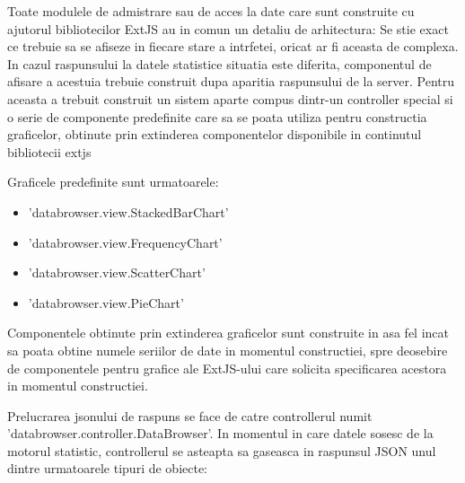 Toate modulele de admistrare sau de acces la date care sunt construite cu ajutorul bibliotecilor ExtJS au in comun un detaliu de arhitectura: Se stie exact ce trebuie sa se afiseze in fiecare stare a intrfetei, oricat ar fi aceasta de complexa. In cazul raspunsului la datele statistice situatia este diferita, componentul de afisare a acestuia trebuie construit dupa aparitia raspunsului de la server. Pentru aceasta a trebuit construit un sistem aparte compus dintr-un controller special si o serie de componente predefinite care sa se poata utiliza pentru constructia graficelor, obtinute prin extinderea componentelor disponibile in continutul bibliotecii extjs

Graficele predefinite sunt urmatoarele: 

\begin{itemize}
\item 'databrowser.view.StackedBarChart'
\item 'databrowser.view.FrequencyChart'
\item 'databrowser.view.ScatterChart'
\item 'databrowser.view.PieChart'
\end{itemize}


Componentele obtinute prin extinderea graficelor sunt construite in asa fel incat sa poata obtine numele seriilor de date in momentul constructiei, spre deosebire de componentele pentru grafice ale ExtJS-ului care solicita specificarea acestora in momentul constructiei. 

Prelucrarea jsonului de raspuns se face de catre controllerul numit 'databrowser.controller.DataBrowser'. In momentul in care datele sosesc de la motorul statistic, controllerul se asteapta sa gaseasca in raspunsul JSON unul dintre urmatoarele tipuri de obiecte:

